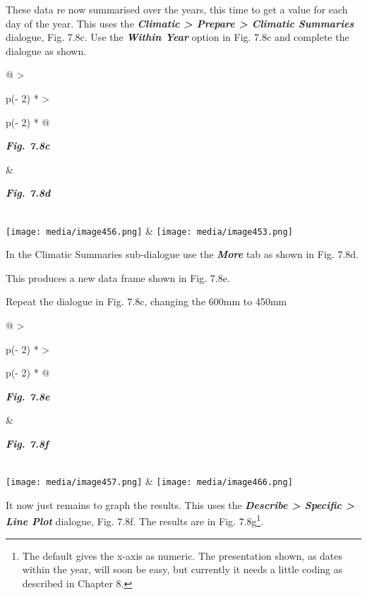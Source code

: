 \documentclass[
  letterpaper,
  DIV=11,
  numbers=noendperiod]{scrreprt}
\begin{document}
These data re now summarised over the years, this time to get a value
for each day of the year. This uses the \textbf{\emph{Climatic
\textgreater{} Prepare \textgreater{} Climatic Summaries}} dialogue,
Fig. 7.8c. Use the \textbf{\emph{Within Year}} option in Fig. 7.8c and
complete the dialogue as shown.

\begin{longtable}[]{@{}
  >{\raggedright\arraybackslash}p{(\columnwidth - 2\tabcolsep) * }
  >{\raggedright\arraybackslash}p{(\columnwidth - 2\tabcolsep) * }@{}}
\toprule\noalign{}
\begin{minipage}[b]{\linewidth}\raggedright
\textbf{\emph{Fig. 7.8c}}
\end{minipage} & \begin{minipage}[b]{\linewidth}\raggedright
\textbf{\emph{Fig. 7.8d}}
\end{minipage} \\
\midrule\noalign{}
\endhead
\bottomrule\noalign{}
\endlastfoot
\texttt{[image: media/image456.png]} &
\texttt{[image: media/image453.png]} \\
\end{longtable}

In the Climatic Summaries sub-dialogue use the \textbf{\emph{More}} tab
as shown in Fig. 7.8d.

This produces a new data frame shown in Fig. 7.8e.

Repeat the dialogue in Fig. 7.8c, changing the 600mm to 450mm

\begin{longtable}[]{@{}
  >{\raggedright\arraybackslash}p{(\columnwidth - 2\tabcolsep) * }
  >{\raggedright\arraybackslash}p{(\columnwidth - 2\tabcolsep) * }@{}}
\toprule\noalign{}
\begin{minipage}[b]{\linewidth}\raggedright
\textbf{\emph{Fig. 7.8e}}
\end{minipage} & \begin{minipage}[b]{\linewidth}\raggedright
\textbf{\emph{Fig. 7.8f}}
\end{minipage} \\
\midrule\noalign{}
\endhead
\bottomrule\noalign{}
\endlastfoot
\texttt{[image: media/image457.png]} &
\texttt{[image: media/image466.png]} \\
\end{longtable}

It now just remains to graph the results. This uses the
\textbf{\emph{Describe \textgreater{} Specific \textgreater{} Line
Plot}} dialogue, Fig. 7.8f. The results are in Fig. 7.8g\footnote{The
  default gives the x-axis as numeric. The presentation shown, as dates
  within the year, will soon be easy, but currently it needs a little
  coding as described in Chapter 8.}.
\end{document}
